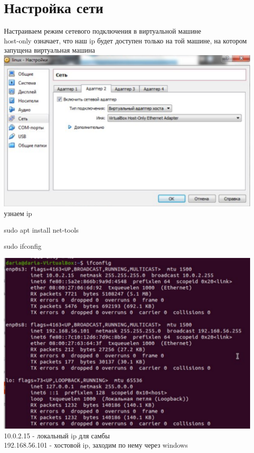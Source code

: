 \documentclass[12pt,a4paper]{scrartcl}
\begin{document}
\section{Настройка сети}
Настраиваем режим сетевого подключения в виртуальной машине
\\[5pt]
host-only означает, что наш ip будет доступен только на той машине, на котором запущена виртуальная машина
\\[5pt]
\includegraphics[scale=10, width=15cm]{f3}
\\[5pt]
узнаем ip
\\[5pt]
\begin{center}
sudo apt install net-tools
\end{center}
\begin{center}
sudo ifconfig
\end{center}
\includegraphics[scale=10, width=15cm]{f4} \\[5pt]
10.0.2.15 - локальный ip для самбы
\\[5pt]
192.168.56.101 - хостовой ip, заходим по нему через windows
\\[5pt]
\end{document}
